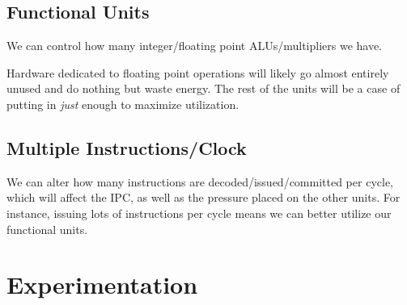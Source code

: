 \documentclass{article}
\begin{document}
\begin{multicols}{2}
  \subsection{Functional Units}
  We can control how many integer/floating point ALUs/multipliers we have.

  Hardware dedicated to floating point operations will likely go almost entirely unused and do nothing but waste energy. The rest of the units will be a case of putting in \textit{just} enough to maximize utilization.

  \subsection{Multiple Instructions/Clock}
  We can alter how many instructions are decoded/issued/committed per cycle, which will affect the IPC, as well as the pressure placed on the other units. For instance, issuing lots of instructions per cycle means we can better utilize our functional units.

  \section{Experimentation}

\end{multicols}
\end{document}
